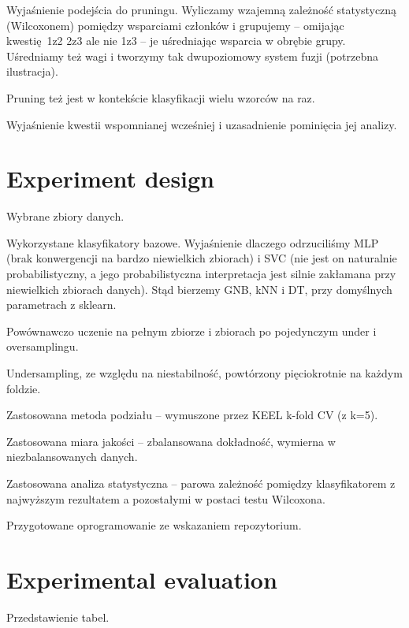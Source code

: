 \documentclass[pmlr]{jmlr}
\begin{document}
Wyjaśnienie podejścia do pruningu. Wyliczamy wzajemną zależność statystyczną (Wilcoxonem) pomiędzy wsparciami członków i grupujemy -- omijając kwestię 1z2 2z3 ale nie 1z3 -- je uśredniając wsparcia w obrębie grupy. Uśredniamy też wagi i tworzymy tak dwupoziomowy system fuzji (potrzebna ilustracja).

Pruning też jest w kontekście klasyfikacji wielu wzorców na raz.

Wyjaśnienie kwestii wspomnianej wcześniej i uzasadnienie pominięcia jej analizy. 

\section{Experiment design}
\label{sec:intro}

Wybrane zbiory danych.

Wykorzystane klasyfikatory bazowe. Wyjaśnienie dlaczego odrzuciliśmy MLP (brak konwergencji na bardzo niewielkich zbiorach) i SVC (nie jest on naturalnie probabilistyczny, a jego probabilistyczna interpretacja jest silnie zakłamana przy niewielkich zbiorach danych). Stąd bierzemy GNB, kNN i DT, przy domyślnych parametrach z sklearn.

Powównawczo uczenie na pełnym zbiorze i zbiorach po pojedynczym under i oversamplingu.

Undersampling, ze względu na niestabilność, powtórzony pięciokrotnie na każdym foldzie.

Zastosowana metoda podziału -- wymuszone przez KEEL k-fold CV (z k=5). 

Zastosowana miara jakości -- zbalansowana dokładność, wymierna w niezbalansowanych danych.

Zastosowana analiza statystyczna -- parowa zależność pomiędzy klasyfikatorem z najwyższym rezultatem a pozostałymi w postaci testu Wilcoxona.

Przygotowane oprogramowanie ze wskazaniem repozytorium.

\section{Experimental evaluation}
\label{sec:intro}

Przedstawienie tabel.

\begin{table}
\end{table}

\begin{table}
\end{table}
\end{document}
